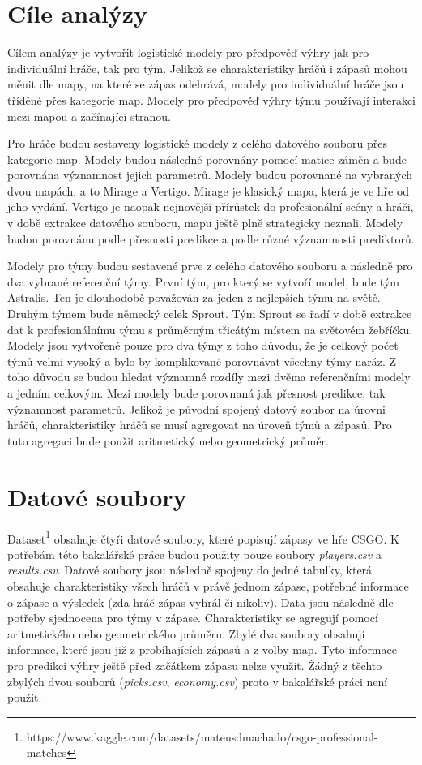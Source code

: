 {\color{red}
\section{Cíle analýzy}
Cílem analýzy je vytvořit logistické modely pro předpověď výhry jak pro individuální hráče, tak pro tým. Jelikož se charakteristiky hráčů i zápasů mohou měnit dle mapy,
na které se zápas odehrává, modely pro individuální hráče jsou tříděné přes kategorie map. Modely pro předpověď výhry týmu používají interakci mezi mapou a začínající
stranou.

Pro hráče budou sestaveny logistické modely z celého datového souboru přes kategorie map. Modely budou následně porovnány pomocí matice záměn
a bude porovnána významnost jejich parametrů. Modely budou porovnané na vybraných dvou mapách, a to Mirage a Vertigo. Mirage je klasický mapa, která je
ve hře od jeho vydání. Vertigo je naopak nejnovější přírůstek do profesionální scény a hráči, v době extrakce datového souboru, mapu ještě plně strategicky 
neznali. Modely budou porovnánu podle přesnosti predikce a podle různé významnosti prediktorů.

Modely pro týmy budou sestavené prve z celého datového souboru a následně pro dva vybrané referenční týmy. První tým, pro který se vytvoří model, bude tým Astralis.
Ten je dlouhodobě považován za jeden z nejlepších týmu na světě. Druhým týmem bude německý celek Sprout. Tým Sprout se řadí v době
extrakce dat k profesionálnímu týmu s průměrným třicátým místem na světovém žebříčku. Modely jsou vytvořené pouze pro dva týmy z toho důvodu, že je celkový
 počet týmů velmi vysoký a bylo by komplikované 
porovnávat všechny týmy naráz. Z toho důvodu se budou hledat významné rozdíly mezi dvěma referenčními modely a jedním celkovým. Mezi modely bude porovnaná jak přesnost
predikce, tak významnost parametrů. Jelikož je původní spojený datový soubor na úrovni hráčů, charakteristiky hráčů se musí agregovat na úroveň týmů a zápasů. Pro tuto
agregaci bude použit aritmetický nebo geometrický průměr.
}

\section{Datové soubory}
Dataset\footnote{https://www.kaggle.com/datasets/mateusdmachado/csgo-professional-matches} obsahuje čtyři 
{\color{red}
datové soubory,
}
které popisují zápasy ve hře
\ac{CSGO}. K potřebám této bakalářské práce budou použity pouze soubory \textit{players.csv} a \textit{results.csv}. Datové soubory jsou následně spojeny do jedné tabulky,
která obsahuje charakteristiky všech hráčů v právě jednom zápase, potřebné informace o zápase a výsledek (zda hráč zápas vyhrál či nikoliv). Data jsou následně dle potřeby
sjednocena pro týmy v zápase. Charakteristiky se agregují pomocí aritmetického nebo geometrického průměru. Zbylé dva soubory obsahují
informace, které jsou již z probíhajících zápasů a z volby map. Tyto informace pro predikci výhry ještě před začátkem zápasu nelze využít. Žádný z těchto
zbylých dvou souborů (\textit{picks.csv}, \textit{economy.csv}) proto v bakalářské práci není použit.

